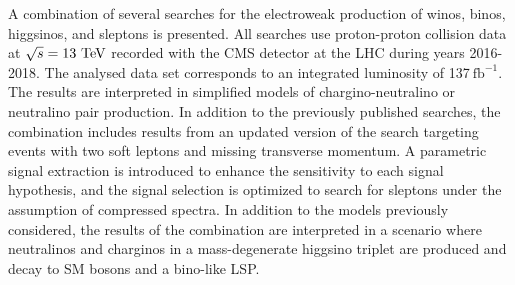 A combination of several searches for the electroweak production of winos, binos, higgsinos, and sleptons is presented.  
All searches use proton-proton collision data at $\sqrt{s}=13\ensuremath{\ \text{Te\hspace{-.08em}V}}\xspace$ recorded with the CMS detector at the LHC during years 2016-2018. The analysed data set corresponds to an integrated luminosity of 137\ensuremath{\ \text{fb}^{-1}}\xspace. The results are interpreted in simplified models of chargino-neutralino or neutralino pair production. In addition to the previously published searches,
the combination includes results from an updated version of
the search targeting events with two soft leptons and missing transverse momentum.
A parametric signal extraction is introduced to enhance the sensitivity to each signal hypothesis, and the signal selection is optimized to search for sleptons under the assumption of compressed spectra.
In addition to the models previously considered, the results of the combination are interpreted in a scenario where neutralinos and charginos in a mass-degenerate higgsino triplet are produced and decay to SM bosons and a bino-like LSP. 
